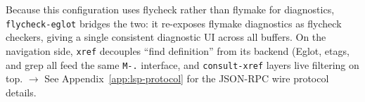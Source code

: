 Because this configuration uses flycheck rather than flymake for diagnostics, \texttt{flycheck-eglot} bridges the two: it re-exposes flymake diagnostics as flycheck checkers, giving a single consistent diagnostic UI across all buffers.  On the navigation side, \texttt{xref} decouples ``find definition'' from its backend (Eglot, etags, and grep all feed the same \texttt{M-.} interface, and \texttt{consult-xref} layers live filtering on top.  \(\rightarrow\) See Appendix~\ref{app:lsp-protocol} for the JSON-RPC wire protocol details.
